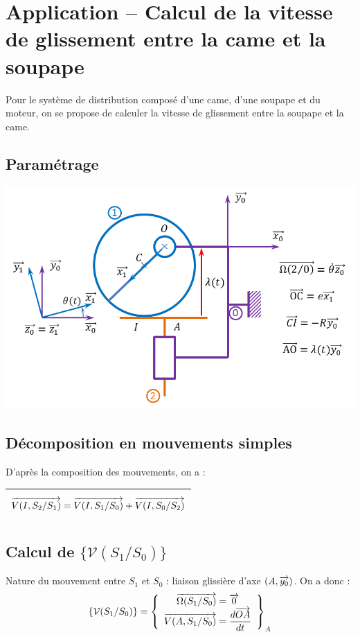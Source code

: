 \documentclass[10pt,oneside]{article}
\begin{document}
\newpage

\section{Application -- Calcul de la vitesse de glissement entre la came et la soupape}
Pour le système de distribution composé d'une came, d'une soupape et du moteur, on se propose de calculer la vitesse de glissement entre la soupape et la came.
\subsection*{Paramétrage}
\begin{center}
\includegraphics[width=.7\textwidth]{png/parametrage} 
\end{center}

\subsection*{Décomposition en mouvements simples}
D'après la composition des mouvements, on a : 
\begin{center}
\begin{tabular}{|p{8cm}|}
\hline
$$
\overrightarrow{V(I,S_2/S_1)} = \overrightarrow{V(I,S_1/S_0)} + \overrightarrow{V(I,S_0/S_2)}
$$
\\
\hline
\end{tabular}
\end{center}

\subsection*{Calcul de $\{\mathcal{V}(S_1/S_0)\}$}

Nature du mouvement entre $S_1$ et $S_0$ : liaison glissière d'axe $(A,\overrightarrow{y_0})$.
On a donc : 
$$
\{\mathcal{V}(S_1/S_0)\} =
\left\{
\begin{array}{c}
\overrightarrow{\Omega(S_1/S_0)} = \overrightarrow{0} \\
\overrightarrow{V(A,S_1/S_0)} = \dfrac{d\overrightarrow{OA}}{dt} \\
\end{array}
\right\}_A
$$
\end{document}
